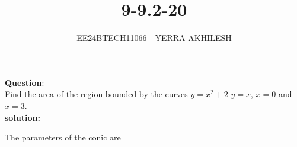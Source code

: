 \documentclass[journal]{IEEEtran}
\begin{document}

\vspace{3cm}

\title{9-9.2-20}
\author{EE24BTECH11066 - YERRA AKHILESH
}
{\let\newpage\relax\maketitle}

\renewcommand{\thefigure}{\theenumi}
\renewcommand{\thetable}{\theenumi}
\setlength{\intextsep}{10pt} %


\renewcommand{\thetable}{\theenumi}
\textbf{Question}:\\
Find the area of the region bounded by the curves $y = x^2+2$ $y = x$, $x = 0$ and $x = 3$.
\\
\textbf{solution: }
\begin{table}[h!]
    \centering
    
\end{table}
The parameters of the conic are\\
\begin{table}[h!]
    \centering
    
    \label{Table2}
\end{table}
\end{document}
